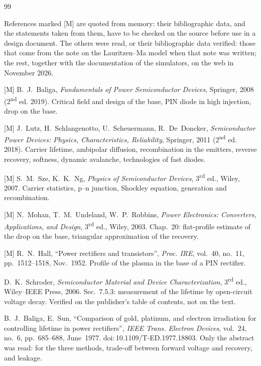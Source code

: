 \documentclass[10pt,a4paper]{scrartcl}
\begin{document}
\begin{thebibliography}{99}\setlength{\parskip}{3pt minus 1pt}\def\UrlBreaks{\do\/\do\_\do\.}
\small
\item[] References marked [M] are quoted from memory: their bibliographic data, and the statements taken from them, have to be checked on the source before use in a design document. The others were read, or their bibliographic data verified: those that come from the note on the Lauritzen--Ma model when that note was written; the rest, together with the documentation of the simulators, on the web in November 2026.

[M] B.~J.~Baliga, \emph{Fundamentals of Power Semiconductor Devices}, Springer, 2008 (2\textsuperscript{nd} ed. 2019). Critical field and design of the base, PIN diode in high injection, drop on the base.

[M] J.~Lutz, H.~Schlangenotto, U.~Scheuermann, R.~De~Doncker, \emph{Semiconductor Power Devices: Physics, Characteristics, Reliability}, Springer, 2011 (2\textsuperscript{nd} ed. 2018). Carrier lifetime, ambipolar diffusion, recombination in the emitters, reverse recovery, softness, dynamic avalanche, technologies of fast diodes.

[M] S.~M.~Sze, K.~K.~Ng, \emph{Physics of Semiconductor Devices}, 3\textsuperscript{rd} ed., Wiley, 2007. Carrier statistics, p--n junction, Shockley equation, generation and recombination.

[M] N.~Mohan, T.~M.~Undeland, W.~P.~Robbins, \emph{Power Electronics: Converters, Applications, and Design}, 3\textsuperscript{rd} ed., Wiley, 2003. Chap.~20: flat-profile estimate of the drop on the base, triangular approximation of the recovery.

[M] R.~N.~Hall, ``Power rectifiers and transistors'', \emph{Proc. IRE}, vol.~40, no.~11, pp.~1512--1518, Nov.~1952. Profile of the plasma in the base of a PIN rectifier.

D.~K.~Schroder, \emph{Semiconductor Material and Device Characterization}, 3\textsuperscript{rd} ed., Wiley--IEEE Press, 2006. Sec.~7.5.3: measurement of the lifetime by open-circuit voltage decay. Verified on the publisher's table of contents, not on the text.

B.~J.~Baliga, E.~Sun, ``Comparison of gold, platinum, and electron irradiation for controlling lifetime in power rectifiers'', \emph{IEEE Trans. Electron Devices}, vol.~24, no.~6, pp.~685--688, June~1977. doi:\,10.1109/T-ED.1977.18803. Only the abstract was read: for the three methods, trade-off between forward voltage and recovery, and leakage.


\end{thebibliography}
\end{document}
